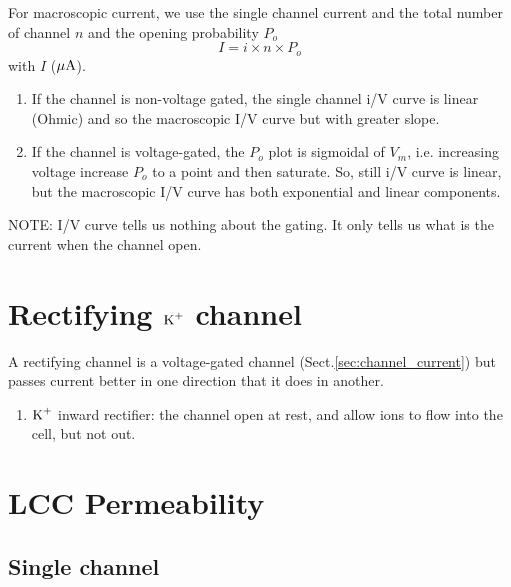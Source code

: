 For macroscopic current, we use the single channel current and the total number
of channel $n$ and the opening probability $P_o$
\begin{equation}
I = i\times n \times P_o
\end{equation}
with $I$ (${\mu\text{A}}$). 
\begin{enumerate}
  \item If the channel is non-voltage gated, the single channel i/V curve is
  linear (Ohmic) and so the macroscopic I/V curve but with greater slope.
   
  \item If the channel is voltage-gated, the $P_o$ plot is sigmoidal
of $V_m$, i.e. increasing voltage increase $P_o$ to a point and then saturate.
So, still i/V curve is linear, but the macroscopic I/V curve has both
exponential and linear components. 
\end{enumerate}
NOTE: I/V curve tells us nothing about the gating. It only tells us what is the
current when the channel open.	

\section{Rectifying ${\text{K}^+}$ channel}

A rectifying channel is a voltage-gated channel (Sect.\ref{sec:channel_current})
but passes current better in one direction that it does in another. 

\begin{enumerate}
  \item ${\text{K}^+}$ inward rectifier: the channel open at rest, and allow ions to flow
  into the cell, but not out. 
\end{enumerate}


\section{LCC Permeability}
\label{sec:LCC_permeability}

\subsection{Single channel}
\label{sec:permeab-single_channel}

